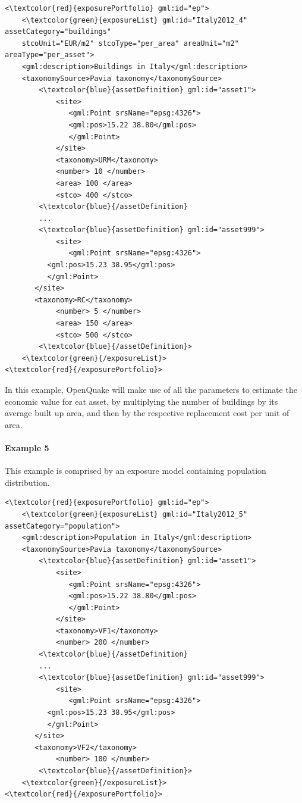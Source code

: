 \begin{Verbatim}[frame=single, commandchars=\\\{\}, samepage=false]
<\textcolor{red}{exposurePortfolio} gml:id="ep">
    <\textcolor{green}{exposureList} gml:id="Italy2012_4" assetCategory="buildings" 
    stcoUnit="EUR/m2" stcoType="per_area" areaUnit="m2" areaType="per_asset">
    <gml:description>Buildings in Italy</gml:description>
    <taxonomySource>Pavia taxonomy</taxonomySource>
        <\textcolor{blue}{assetDefinition} gml:id="asset1">
            <site>
               <gml:Point srsName="epsg:4326">
               <gml:pos>15.22 38.80</gml:pos>
               </gml:Point>
            </site>
            <taxonomy>URM</taxonomy>
            <number> 10 </number>
            <area> 100 </area>
            <stco> 400 </stco>
        <\textcolor{blue}{/assetDefinition} 
        ...
        <\textcolor{blue}{assetDefinition} gml:id="asset999">
            <site>
               <gml:Point srsName="epsg:4326">
	      <gml:pos>15.23 38.95</gml:pos>
	      </gml:Point>
	   </site>
	   <taxonomy>RC</taxonomy>
            <number> 5 </number>
            <area> 150 </area>
            <stco> 500 </stco>
        <\textcolor{blue}{/assetDefinition}> 
    <\textcolor{green}{/exposureList}>
<\textcolor{red}{/exposurePortfolio}>
\end{Verbatim}

In this example, OpenQuake will make use of all the parameters to estimate the economic value for eat asset, by multiplying the number of buildings by its average built up area, and then by the respective replacement cost per unit of area. 

 \paragraph{Example 5}
This example is comprised by an exposure model containing population distribution.

\begin{Verbatim}[frame=single, commandchars=\\\{\}, samepage=false]
<\textcolor{red}{exposurePortfolio} gml:id="ep">
    <\textcolor{green}{exposureList} gml:id="Italy2012_5" assetCategory="population">
    <gml:description>Population in Italy</gml:description>
    <taxonomySource>Pavia taxonomy</taxonomySource>
        <\textcolor{blue}{assetDefinition} gml:id="asset1">
            <site>
               <gml:Point srsName="epsg:4326">
               <gml:pos>15.22 38.80</gml:pos>
               </gml:Point>
            </site>
            <taxonomy>VF1</taxonomy>
            <number> 200 </number>
        <\textcolor{blue}{/assetDefinition} 
        ...
        <\textcolor{blue}{assetDefinition} gml:id="asset999">
            <site>
               <gml:Point srsName="epsg:4326">
	      <gml:pos>15.23 38.95</gml:pos>
	      </gml:Point>
	   </site>
	   <taxonomy>VF2</taxonomy>
            <number> 100 </number>
        <\textcolor{blue}{/assetDefinition}> 
    <\textcolor{green}{/exposureList}>
<\textcolor{red}{/exposurePortfolio}>
\end{Verbatim}

